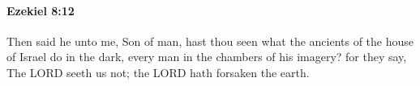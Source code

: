 
		\paragraph{Ezekiel 8:12} %
			\label{EZEKIEL-8-12}

			Then said he unto me, Son of man, hast thou seen what the ancients of the house of Israel do in the dark, every man in the chambers of his imagery? for they say, The LORD seeth us not; the LORD hath forsaken the earth.



